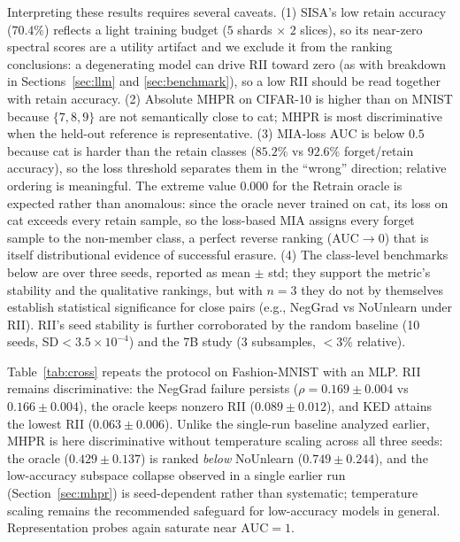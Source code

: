 \documentclass[smallextended]{svjour3}       %
\begin{document}
Interpreting these results requires several caveats. (1) SISA's low retain accuracy ($70.4\%$) reflects a light training budget ($5$ shards $\times$ $2$ slices), so its near-zero spectral scores are a utility artifact and we exclude it from the ranking conclusions: a degenerating model can drive RII toward zero (as with breakdown in Sections~\ref{sec:llm} and \ref{sec:benchmark}), so a low RII should be read together with retain accuracy. (2) Absolute MHPR on CIFAR-10 is higher than on MNIST because $\{7,8,9\}$ are not semantically close to cat; MHPR is most discriminative when the held-out reference is representative. (3) MIA-loss AUC is below $0.5$ because cat is harder than the retain classes ($85.2\%$ vs $92.6\%$ forget/retain accuracy), so the loss threshold separates them in the ``wrong'' direction; relative ordering is meaningful. The extreme value $0.000$ for the Retrain oracle is expected rather than anomalous: since the oracle never trained on cat, its loss on cat exceeds every retain sample, so the loss-based MIA assigns every forget sample to the non-member class, a perfect reverse ranking (AUC${\to}0$) that is itself distributional evidence of successful erasure. (4) The class-level benchmarks below are over three seeds, reported as mean $\pm$ std; they support the metric's stability and the qualitative rankings, but with $n{=}3$ they do not by themselves establish statistical significance for close pairs (e.g., NegGrad vs NoUnlearn under RII). RII's seed stability is further corroborated by the random baseline (10 seeds, SD$<3.5{\times}10^{-4}$) and the 7B study (3 subsamples, $<$3\% relative).

Table~\ref{tab:cross} repeats the protocol on Fashion-MNIST with an MLP. RII remains discriminative: the NegGrad failure persists ($\rho{=}0.169{\pm}0.004$ vs $0.166{\pm}0.004$), the oracle keeps nonzero RII ($0.089{\pm}0.012$), and KED attains the lowest RII ($0.063{\pm}0.006$). Unlike the single-run baseline analyzed earlier, MHPR is here discriminative without temperature scaling across all three seeds: the oracle ($0.429{\pm}0.137$) is ranked \emph{below} NoUnlearn ($0.749{\pm}0.244$), and the low-accuracy subspace collapse observed in a single earlier run (Section~\ref{sec:mhpr}) is seed-dependent rather than systematic; temperature scaling remains the recommended safeguard for low-accuracy models in general. Representation probes again saturate near $\mathrm{AUC}{=}1$.
\end{document}
